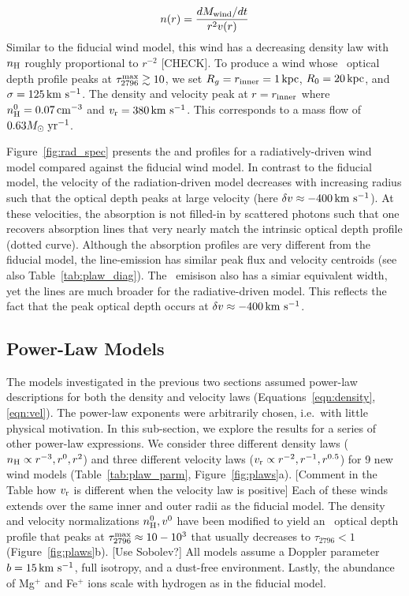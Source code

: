 \documentclass[12pt,preprint]{aastex}
\begin{document}
\begin{equation}
n(r) = \frac{dM_{\rm wind}/dt}{r^2 v(r)}
\end{equation}
Similar to the fiducial wind model, this wind has a decreasing density
law with $n_{\rm H}$ roughly proportional to $r^{-2}$ [CHECK].
To produce a wind whose \mgiia\ optical depth profile peaks at 
$\tau_{2796}^{\rm max} \gtrsim 10$, we set $R_g = r_{\rm inner} =
1\,\rm kpc$, $R_0=20\,\rm kpc$, and $\sigma = 125 \, {\rm km~s^{-1}}$.  The density
and velocity peak at $r=r_{\rm inner}$ where $n_{\rm H}^0 = 0.07
\, {\rm cm^{-3}}$ and $v_{\rm r} = 380 \, {\rm km~s^{-1}}$.  This corresponds to a mass flow of
$0.63 M_\odot\; \rm yr^{-1}$.  

Figure~\ref{fig:rad_spec} presents the  and 
profiles for a radiatively-driven wind model compared against the
fiducial wind model.
In contrast to the fiducial model, the
velocity of the radiation-driven model decreases with increasing
radius such that the optical depth peaks at large velocity (here $\delta v
\approx -400 \, {\rm km~s^{-1}}$).  At these velocities, the absorption is not
filled-in by scattered photons such that one recovers absorption lines
that very nearly match the intrinsic optical depth profile (dotted
curve).  Although the  absorption profiles are very
different from the fiducial model, the  line-emission has
similar peak flux and velocity centroids (see also
Table~\ref{tab:plaw_diag}).  The \feiis\ emisison also has a simiar
equivalent width, yet the lines are much broader for the
radiative-driven model. This reflects the fact that the peak optical
depth occurs at $\delta v \approx -400 \, {\rm km~s^{-1}}$.


\subsection{Power-Law Models}
\label{sec:power}

The models investigated in the previous two sections
assumed power-law descriptions for both the density and velocity
laws (Equations~\ref{eqn:density},\ref{eqn:vel}).
The power-law exponents were arbitrarily chosen, i.e.\ with little physical
motivation.  In this sub-section, we explore the results for a series
of other power-law expressions.
We consider three different density laws ($n_{\rm H} \propto
r^{-3}, r^{0}, r^2$) and three different velocity laws ($v_{\rm r}
\propto r^{-2}, r^{-1}, r^{0.5}$) for 9 new wind models
(Table~\ref{tab:plaw_parm}, Figure~\ref{fig:plaws}a).  
[Comment in the Table how $v_{\rm r}$ is
different when the velocity law is positive]  
Each of these winds extends over the same inner and outer radii as the
fiducial model.
The density and velocity normalizations $n_{\rm H}^0, v^0$ have been
modified to yield an \mgiia\ optical depth profile that peaks at
$\tau_{2796}^{\rm max} \approx 10-10^3$ that usually decreases to
$\tau_{2796} < 1$ (Figure~\ref{fig:plaws}b). [Use Sobolev?]
All models assume a Doppler parameter
$b=15\, {\rm km~s^{-1}}$, full isotropy, and a dust-free environment.
Lastly, the abundance of Mg$^+$ and Fe$^+$ ions scale with hydrogen as
in the fiducial model.
\end{document}
